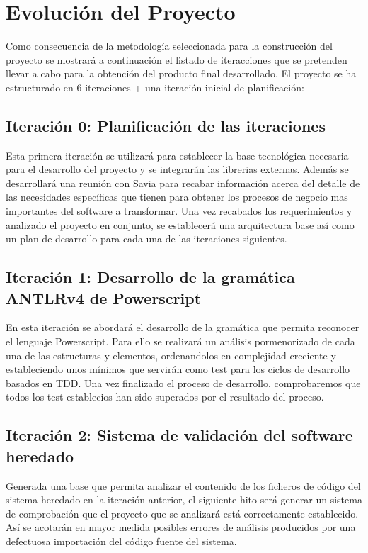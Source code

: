 \section{Evolución del Proyecto} \label{evolucion-proyecto}
Como consecuencia de la metodología seleccionada para la construcción del proyecto se mostrará a continuación el listado de iteracciones que se pretenden 
llevar a cabo para la obtención del producto final desarrollado. El proyecto se ha estructurado en 6 iteraciones + una iteración inicial de planificación:

\subsection{Iteración 0: Planificación de las iteraciones}

Esta primera iteración se utilizará para establecer la base tecnológica necesaria para el desarrollo del proyecto y se integrarán las librerias externas.
Además se desarrollará una reunión con Savia para recabar información acerca del detalle de las necesidades 
específicas que tienen para obtener los procesos de negocio mas importantes del software a transformar. Una vez recabados los requerimientos y analizado 
el proyecto en conjunto, se establecerá una arquitectura base así como un plan de desarrollo para cada una de las iteraciones siguientes.



\subsection{Iteración 1: Desarrollo de la gramática ANTLRv4 de Powerscript}

En esta iteración se abordará el desarrollo de la gramática que permita reconocer el lenguaje Powerscript. Para ello se realizará un análisis pormenorizado
de cada una de las estructuras y elementos, ordenandolos en complejidad creciente y estableciendo unos mínimos que servirán como test para los ciclos de
desarrollo basados en TDD. Una vez finalizado el proceso de desarrollo, comprobaremos que todos los test establecios han sido superados por el resultado
del proceso.


\subsection{Iteración 2: Sistema de validación del software heredado}

Generada una base que permita analizar el contenido de los ficheros de código del sistema heredado en la iteración anterior, el siguiente hito será generar un
sistema de comprobación que el proyecto que se analizará está correctamente establecido. Así se acotarán en mayor medida posibles errores de análisis producidos
por una defectuosa importación del código fuente del sistema.


